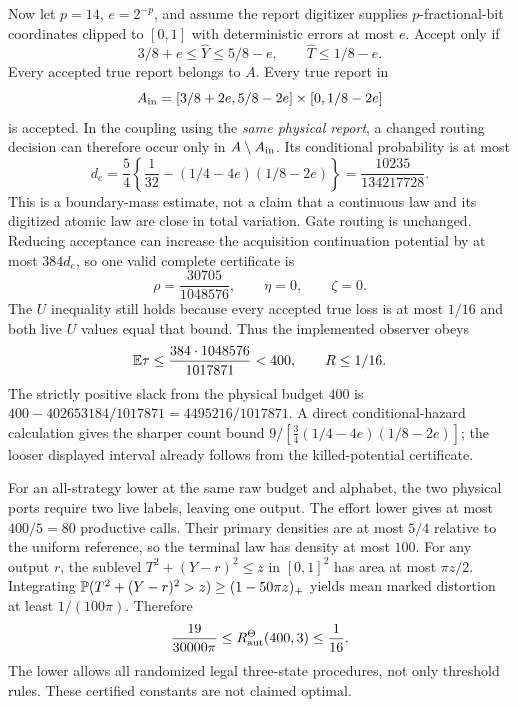 Now let $p=14$, $e=2^{-p}$, and assume the report digitizer supplies $p$-fractional-bit coordinates clipped to $[0,1]$ with deterministic errors at most $e$. Accept only if
\begin{equation}\label{eq:inward-test}
 3/8+e\le\widehat Y\le5/8-e,\qquad \widehat T\le1/8-e.
\end{equation}
Every accepted true report belongs to $A$. Every true report in
\[
 A_{\rm in}=[3/8+2e,5/8-2e]\times[0,1/8-2e]
\]
is accepted. In the coupling using the \emph{same physical report}, a changed routing decision can therefore occur only in $A\setminus A_{\rm in}$. Its conditional probability is at most
\[
 d_e=\frac54\left\{\frac1{32}-(1/4-4e)(1/8-2e)\right\}
      =\frac{10235}{134217728}.
\]
This is a boundary-mass estimate, not a claim that a continuous law and its digitized atomic law are close in total variation. Gate routing is unchanged. Reducing acceptance can increase the acquisition continuation potential by at most $384d_e$, so one valid complete certificate is
\begin{equation}\label{eq:dyadic-errors}
 \rho=\frac{30705}{1048576},\qquad \eta=0,\qquad\zeta=0.
\end{equation}
The $U$ inequality still holds because every accepted true loss is at most $1/16$ and both live $U$ values equal that bound. Thus the implemented observer obeys
\begin{equation}\label{eq:dyadic-final}
 \mathbb E\tau\le\frac{384\cdot1048576}{1017871}<400,
 \qquad R\le1/16.
\end{equation}
The strictly positive slack from the physical budget $400$ is
$400-402653184/1017871=4495216/1017871$. A direct conditional-hazard calculation gives the sharper count bound
$9/[\frac34(1/4-4e)(1/8-2e)]$; the looser displayed interval already follows from the killed-potential certificate.

For an all-strategy lower at the same raw budget and alphabet, the two physical ports require two live labels, leaving one output. The effort lower gives at most $400/5=80$ productive calls. Their primary densities are at most $5/4$ relative to the uniform reference, so the terminal law has density at most $100$. For any output $r$, the sublevel
$T^2+(Y-r)^2\le z$ in $[0,1]^2$ has area at most $\pi z/2$. Integrating $\mathbb P(T^2+(Y-r)^2>z)\ge(1-50\pi z)_+$ yields mean marked distortion at least $1/(100\pi)$. Therefore
\begin{equation}\label{eq:dyadic-risk-interval}
 \frac{19}{30000\pi}\le R_{\mathrm{aut}}^\Theta(400,3)\le\frac1{16}.
\end{equation}
The lower allows all randomized legal three-state procedures, not only threshold rules. These certified constants are not claimed optimal.

